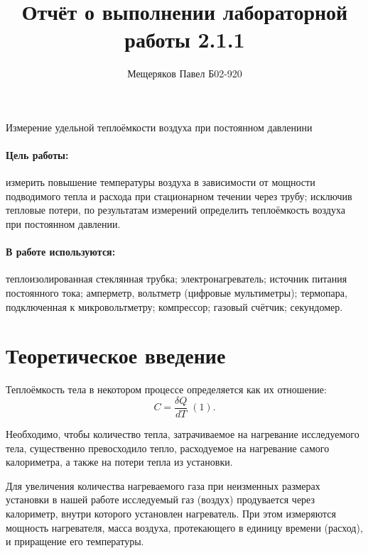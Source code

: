 \documentclass[a4paper,12pt]{article}
\author{Мещеряков Павел Б02-920}
\title{Отчёт о выполнении лабораторной работы 2.1.1}
\begin{document}
	\maketitle
	\begin{center}
		{\Large Измерение удельной теплоёмкости воздуха при постоянном давленини}
	\end{center}
	\paragraph*{Цель работы:} измерить повышение температуры воздуха в зависимости от мощности
	подводимого тепла и расхода при стационарном течении через трубу; исключив тепловые потери, по результатам измерений определить теплоёмкость воздуха при постоянном давлении.
	\paragraph*{В работе используются:} теплоизолированная стеклянная трубка; электронагреватель; источник питания постоянного тока; амперметр, вольтметр (цифровые мультиметры); термопара, подключенная к микровольтметру; компрессор; газовый счётчик;
	секундомер.
	\section{Теоретическое введение}
	
		 Теплоёмкость тела в некотором процессе определяется как их отношение: $$ C = \frac{\delta Q}{dT} \; (1).$$
		 
		 Необходимо, чтобы количество тепла, затрачиваемое на нагревание исследуемого тела, существенно превосходило тепло, расходуемое на нагревание самого калориметра, а также на потери тепла из установки.
		 
		 Для увеличения количества нагреваемого газа при неизменных размерах установки в нашей работе исследуемый газ (воздух) продувается через калориметр, внутри которого установлен нагреватель. При этом
		 измеряются мощность нагревателя, масса воздуха, протекающего в единицу
		 времени (расход), и приращение его температуры.
		 
\end{document}
